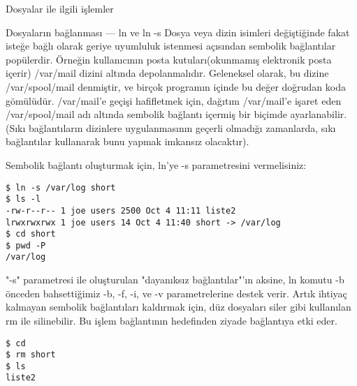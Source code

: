\begin{section}{Dosyalar ile ilgili işlemler}
\begin{subsection}{Dosyaların bağlanması — ln ve ln -s}
Dosya veya dizin isimleri değiştiğinde fakat isteğe bağlı olarak geriye uyumluluk istenmesi açısından sembolik bağlantılar popülerdir. Örneğin kullanıcının posta kutuları(okunmamış elektronik posta içerir) /var/mail dizini altında depolanmalıdır. Geleneksel olarak, bu dizine /var/spool/mail denmiştir, ve birçok programın içinde bu değer doğrudan koda gömülüdür. /var/mail'e geçişi hafifletmek için, dağıtım /var/mail'e işaret eden /var/spool/mail adı altında sembolik bağlantı içermiş bir biçimde ayarlanabilir.(Sıkı bağlantıların dizinlere uygulanmasının geçerli olmadığı zamanlarda, sıkı bağlantılar kullanarak bunu yapmak imkansız olacaktır).

Sembolik bağlantı oluşturmak için, ln'ye -s parametresini vermelisiniz:
\begin{verbatim}
$ ln -s /var/log short
$ ls -l
-rw-r--r-- 1 joe users 2500 Oct 4 11:11 liste2
lrwxrwxrwx 1 joe users 14 Oct 4 11:40 short -> /var/log
$ cd short
$ pwd -P
/var/log
\end{verbatim}
"-s" parametresi ile oluşturulan "dayanıksız bağlantılar"'ın aksine, ln komutu -b önceden bahsettiğimiz -b, -f, -i, ve -v parametrelerine destek verir.
Artık ihtiyaç kalmayan sembolik bağlantıları kaldırmak için, düz dosyaları siler gibi kullanılan rm ile silinebilir. Bu işlem bağlantının hedefinden ziyade bağlantıya etki eder.
\begin{verbatim}
$ cd
$ rm short
$ ls
liste2
\end{verbatim}


\end{subsection}
\end{section}
